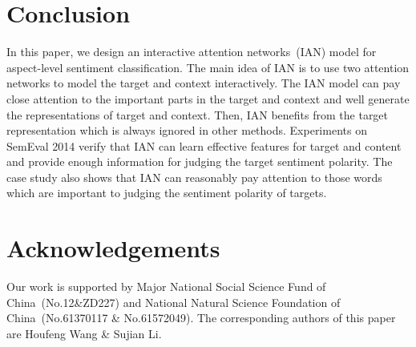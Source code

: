 \documentclass{article}
\begin{document}
\section{Conclusion}
In this paper, we design an interactive attention networks~(IAN) model for aspect-level sentiment classification.
The main idea of IAN is to use two attention networks to model the target and context interactively. 
The IAN model can pay close attention to the important parts in the  target and context and well generate the representations of target and context.
Then, IAN benefits from the target representation which is always ignored in other methods.
Experiments on SemEval 2014 verify that IAN can learn effective features for target and content and provide enough information for judging the target sentiment polarity.
The case study also shows that IAN  can reasonably pay attention to those words which are important to judging the sentiment polarity of targets. 

 \section*{Acknowledgements}
 Our work is supported by Major National Social Science Fund of China~(No.12\&ZD227) and National Natural Science Foundation of China~(No.61370117 \& No.61572049). The corresponding authors of this paper are Houfeng Wang \& Sujian Li.


\end{document}

